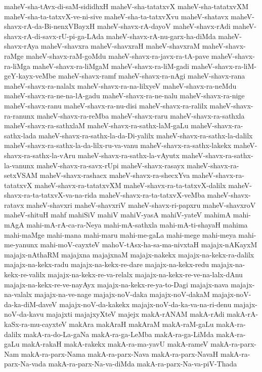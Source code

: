 {maheV-sha-tAvx-di-saM-sididhxH
maheV-sha-tatatxvX
maheV-sha-tatatxvXM
maheV-sha-ta-tatxvX-ve-ni-sive
maheV-sha-ta-tatxvXvu
maheV-shatavx
maheV-shavx-rA-da-Bi-nenxVBayxH
maheV-shavx-rA-dayoV
maheV-shavx-rAdi
maheV-shavx-rA-di-savx-rU-pi-ga-LAda
maheV-shavx-rA-nu-garx-ha-diMda
maheV-shavx-rAya
maheV-shavxra
maheV-shavxraH
maheV-shavxraM
maheV-shavx-raMge
maheV-shavx-raM-goMdu
maheV-shavx-ra-javx-ra-tA-pave
maheV-shavx-ra-liMga
maheV-shavx-ra-liMgaM
maheV-shavx-ra-liM-gadi
maheV-shavx-ra-liM-geY-kayx-veMbe
maheV-shavx-ramf
maheV-shavx-ra-nAgi
maheV-shavx-rana
maheV-shavx-ra-nalalx
maheV-shavx-ra-na-lilxyeV
maheV-shavx-ra-neMdu
maheV-shavx-ra-ne-na-lA-gadu
maheV-shavx-ra-ne-nalu
maheV-shavx-ra-nige
maheV-shavx-ranu
maheV-shavx-ra-nu-disi
maheV-shavx-ra-ralilx
maheV-shavx-ra-ranunx
maheV-shavx-ra-reMba
maheV-shavx-raru
maheV-shavx-ra-sathxla
maheV-shavx-ra-sathxlaM
maheV-shavx-ra-sathx-laM-gaLu
maheV-shavx-ra-sathx-lada
maheV-shavx-ra-sathx-la-da-Di-yalilx
maheV-shavx-ra-sathx-la-dalilx
maheV-shavx-ra-sathx-la-da-lilx-ru-va-vanu
maheV-shavx-ra-sathx-lakekx
maheV-shavx-ra-sathx-la-vAru
maheV-shavx-ra-sathx-la-vAyutx
maheV-shavx-ra-sathx-la-vanunx
maheV-shavx-ra-savx-rUpi
maheV-shavx-rasayx
maheV-shavx-ra-setxVSAM
maheV-shavx-rashacx
maheV-shavx-ra-shecxYva
maheV-shavx-ra-tatatxvX
maheV-shavx-ra-tatatxvXM
maheV-shavx-ra-ta-tatxvX-dalilx
maheV-shavx-ra-ta-tatxvX-va-na-rida
maheV-shavx-ra-ta-tatxvX-veMba
maheV-shavx-ratavx
maheV-shavxri
maheV-shavxriV
maheV-shavx-ri-papxru
maheV-shavxroV
maheV-shituH
mahf
mahiSiV
mahiV
mahiV-yasA
mahiV-yateV
mahimA
mahi-mAgA
mahi-mA-rA-ca-ra-Neya
mahi-mA-sathxla
mahi-mA-ti-shayaH
mahima
mahi-maMge
mahi-mana
mahi-maru
mahi-me-gaLa
mahi-mege
mahi-meya
mahi-me-yanunx
mahi-moV-cayxteV
mahoV-tAsx-ha-sa-ma-nivxtaH
majajx-nAKayxM
majajx-nAthaRM
majajxna
majajxnaM
majajx-nakekx
majajx-na-kekx-ra-dalilx
majajx-na-kekx-radu
majajx-na-kekx-re-dare
majajx-na-kekx-redu
majajx-na-kekx-re-valilx
majajx-na-kekx-re-va-relalx
majajx-na-kekx-re-ve-na-lalx-dAnu
majajx-na-kekx-re-ve-nayAyx
majajx-na-kekx-re-ya-to-Dagi
majajx-nava
majajx-na-valalx
majajx-na-ve-nage
majajx-noV-daka
majajx-noV-dakaM
majajx-noV-da-ka-diM-daveV
majajx-noV-da-kakekx
majajx-noV-da-ka-va-na-ri-denu
majajx-noV-da-kavu
majajxti
majajxyXteV
majejx
makA-rANAM
makA-rAdi
makA-rA-kaSx-ra-mu-cayxteV
makAra
makAraH
makAraM
makA-raM-gaLu
makA-ra-dalilx
makA-ra-do-La-gaNa
makA-ra-ga-LeMba
makA-ra-ga-LiMda
makA-ra-gaLu
makA-rakaH
makA-rakekx
makA-ra-ma-yavU
makA-rameV
makA-ra-parx-Nam
makA-ra-parx-Nama
makA-ra-parx-Nava
makA-ra-parx-NavaH
makA-ra-parx-Na-vada
makA-ra-parx-Na-va-diMda
makA-ra-parx-Na-va-piV-Thada
}
